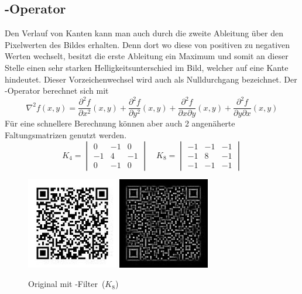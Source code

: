 \subsection*{-Operator}
Den Verlauf von Kanten kann man auch durch die zweite Ableitung über den Pixelwerten des Bildes erhalten.
Denn dort wo diese von positiven zu negativen Werten wechselt, besitzt die erste Ableitung ein Maximum und somit an dieser Stelle einen sehr starken Helligkeitsunterschied im Bild, welcher auf eine Kante hindeutet.
Dieser Vorzeichenwechsel wird auch als Nulldurchgang bezeichnet.
Der -Operator berechnet sich mit
\begin{equation}
  \nabla^2 f(x,y) = \frac{\partial^2 f}{\partial x^2}(x,y) + \frac{\partial^2 f}{\partial y^2}(x,y) + \frac{\partial^2 f}{\partial x \partial y}(x,y) + \frac{\partial^2 f}{\partial y \partial x}(x,y)
\end{equation}
Für eine schnellere Berechnung können aber auch 2 angenäherte Faltungsmatrizen genutzt werden.
\begin{equation}
  K_4 = \begin{vmatrix}
     0 & -1 &  0 \\
    -1 &  4 & -1 \\
     0 & -1 &  0
  \end{vmatrix}
  \quad
  K_8 = \begin{vmatrix}
    -1 & -1 & -1 \\
    -1 &  8 & -1 \\
    -1 & -1 & -1
  \end{vmatrix}
\end{equation}
\begin{figure}[H]
  \centering
  \includegraphics[height=4cm]{img/QR/perfect_03.jpg}
  \includegraphics[height=4cm]{img/QR/qr-laplace.jpg}
  \caption[Beispiel -Filter]{Original mit -Filter~($K_8$)}
  \label{fig:sharpgauss}
\end{figure}



